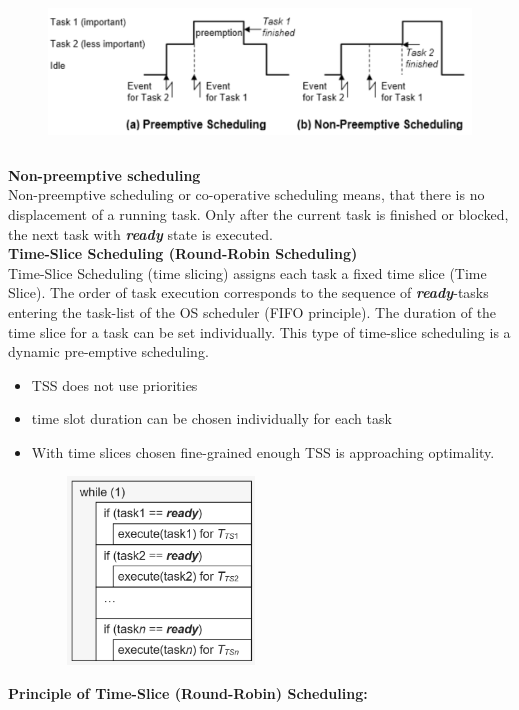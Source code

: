 	\begin{figure}[h]
    \centering
    \includegraphics[width=14cm, height=4cm]{Images/image89.png}
    \label{fig:Fig 34}
    \end{figure}
\os{\newpage}
{\rot\bf{Non-preemptive scheduling}}\\

Non-preemptive scheduling or co-operative scheduling means, that there is no displacement of a running task. Only after the current task is finished or blocked, the next task with \textbf{\textit{ready}} state is executed.\\

{\rot\bf Time-Slice Scheduling (Round-Robin Scheduling)}\\

Time-Slice Scheduling (time slicing) assigns each task a fixed time slice (Time Slice). The order of task execution corresponds to the sequence of \textbf{\textit{ready}}-tasks entering the task-list of the OS scheduler (FIFO principle). The duration of the time slice for a task can be set individually. This type of time-slice scheduling is a dynamic pre-emptive scheduling. 
\os{\newpage}
\begin{itemize}
	\item TSS does not use priorities
	\item time slot duration can be chosen individually for each task
	\item With time slices chosen fine-grained enough TSS is approaching optimality.
\end{itemize}

	\begin{figure}[h]
    \centering
    \includegraphics[width=6cm, height=5cm]{Images/image90.png}
    \label{fig:Fig 35}
    \end{figure}
\newpage
\textbf{Principle of Time-Slice (Round-Robin) Scheduling: }


